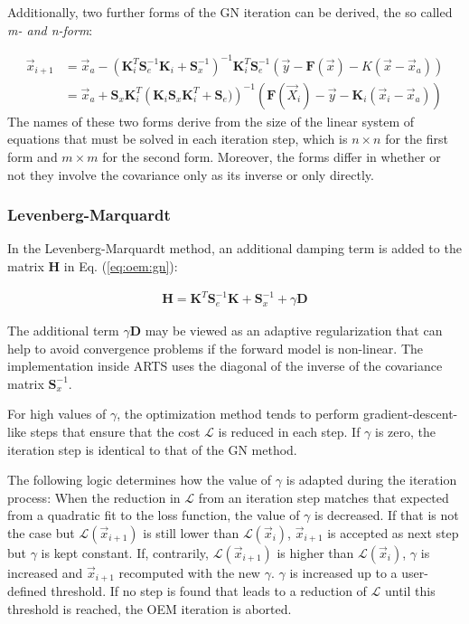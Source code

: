 Additionally, two further forms of the GN iteration can be derived, the so called
\textit{m- and n-form}:

\begin{eqnarray}
\vec{x}_{i + 1} &= \vec{x}_a - 
\left (\mathbf{K}_i^T \mathbf{S}_e^{-1} \mathbf{K}_i + \mathbf{S}_x^{-1} \right )^{-1} \mathbf{K}_i^T\mathbf{S}_e^{-1}
\left(\vec{y} - \mathbf{F}(\vec{x}) - K(\vec{x} - \vec{x}_a) \right ) \\
&= \vec{x}_a  + \mathbf{S}_x \mathbf{K}_i ^ T
 \left (\mathbf{K}_i \mathbf{S}_x \mathbf{K}_i^T + \mathbf{S}_e) \right )^{-1}
\left ( \mathbf{F}(\vec{X}_i) - \vec{y} - \mathbf{K}_i(\vec{x}_i - \vec{x}_a) \right)
\end{eqnarray}
The names of these two forms derive from the size of the linear system of equations
that must be solved in each iteration step, which is $n \times n$ for the first
form and $m \times m$ for the second form. Moreover, the forms differ in whether
or not they involve the covariance only as its inverse or only directly.

\subsubsection{Levenberg-Marquardt}
In the Levenberg-Marquardt method, an additional damping term is added to the
matrix $\mathbf{H}$ in Eq. (\ref{eq:oem:gn}):


\begin{eqnarray}
\mathbf{H} = \mathbf{K}^T\mathbf{S}_e^{-1}\mathbf{K} + \mathbf{S}_x^{-1} +\gamma\mathbf{D}
\end{eqnarray}

The additional term $\gamma \mathbf{D}$ may be viewed as an adaptive regularization that
can help to avoid convergence problems if  the forward model is non-linear. The
 implementation
inside ARTS uses the diagonal of the inverse of the covariance matrix $\mathbf{S}_x^{-1}$.

For high values of $\gamma$, the optimization method tends to perform 
 gradient-descent-like steps that ensure that the cost $\mathcal{L}$
is reduced in each step. If $\gamma$ is zero, the iteration step is identical
to that of the GN method.

The following logic determines how the value of $\gamma$ is adapted during
the iteration process: When the reduction in $\mathcal{L}$ from an iteration
 step matches that expected from a quadratic fit to the loss function, the
 value of $\gamma$ is decreased.  If that is not the
 case but $\mathcal{L}(\vec{x}_{i + 1})$ is still  lower than
 $\mathcal{L}(\vec{x}_i)$, $\vec{x}_{i+1}$ is accepted
as next step but $\gamma$ is kept constant. If, contrarily, 
$\mathcal{L}(\vec{x}_{i+1})$ is higher than  $\mathcal{L}(\vec{x}_i)$,
 $\gamma$ is increased and $\vec{x}_{i+1}$  recomputed with the new $\gamma$.
$\gamma$ is increased up to a user-defined threshold. If no step is found
 that leads to a reduction of $\mathcal{L}$ until this threshold is reached,
the OEM iteration is aborted.


